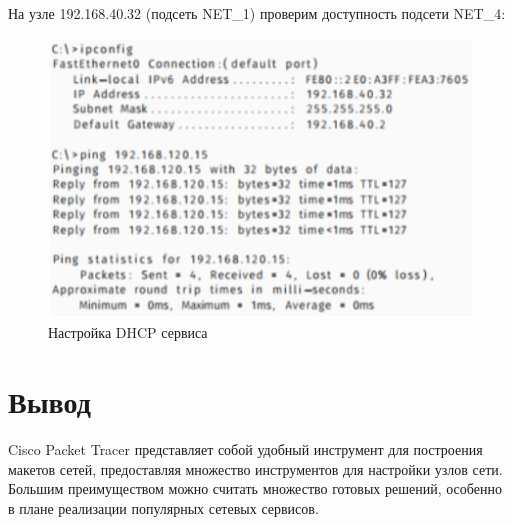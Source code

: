 \documentclass[14pt,a4paper,report]{report}
\begin{document}
\clearpage

На узле 192.168.40.32 (подсеть NET\_1) проверим доступность подсети NET\_4:

\begin{figure}[h!]
	\centering
	\includegraphics[scale = 0.95]{images/11.png}
	\caption{Настройка DHCP сервиса}
\end{figure}

\section{Вывод}

Cisco Packet Tracer представляет собой удобный инструмент для построения макетов сетей, предоставляя множество инструментов для настройки узлов сети. Большим преимуществом можно считать множество готовых решений, особенно в плане реализации популярных сетевых сервисов.
\end{document}
